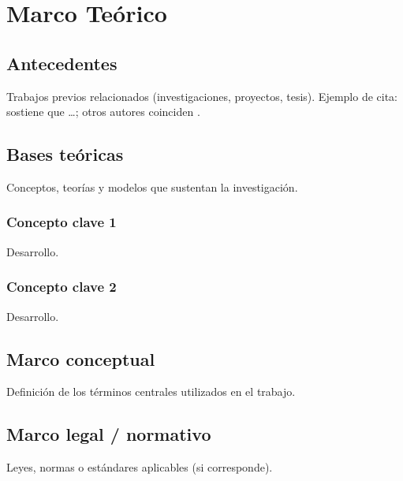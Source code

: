 \chapter{Marco Teórico}
\label{cap:marco-teorico}

\section{Antecedentes}

Trabajos previos relacionados (investigaciones, proyectos, tesis). Ejemplo de
cita: \textcite{ejemplo2024} sostiene que \dots; otros autores coinciden
\parencite{ejemplo2024}.

\section{Bases teóricas}

Conceptos, teorías y modelos que sustentan la investigación.

\subsection{Concepto clave 1}
Desarrollo.

\subsection{Concepto clave 2}
Desarrollo.

\section{Marco conceptual}

Definición de los términos centrales utilizados en el trabajo.

\section{Marco legal / normativo}

Leyes, normas o estándares aplicables (si corresponde).
